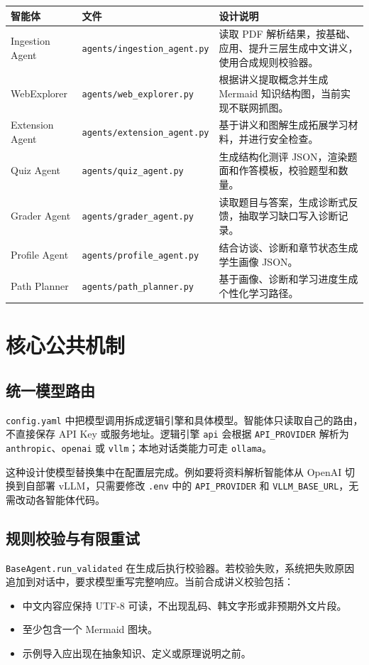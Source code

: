 \documentclass[UTF8,fontset=windows,zihao=-4,openany]{ctexrep}
\begin{document}
\begin{longtable}{p{}p{}p{}}
\toprule
智能体 & 文件 & 设计说明\\
\midrule
Ingestion Agent & \texttt{agents/ingestion\_agent.py} & 读取 PDF 解析结果，按基础、应用、提升三层生成中文讲义，使用合成规则校验器。\\
WebExplorer & \texttt{agents/web\_explorer.py} & 根据讲义提取概念并生成 Mermaid 知识结构图，当前实现不联网抓图。\\
Extension Agent & \texttt{agents/extension\_agent.py} & 基于讲义和图解生成拓展学习材料，并进行安全检查。\\
Quiz Agent & \texttt{agents/quiz\_agent.py} & 生成结构化测评 JSON，渲染题面和作答模板，校验题型和数量。\\
Grader Agent & \texttt{agents/grader\_agent.py} & 读取题目与答案，生成诊断式反馈，抽取学习缺口写入诊断记录。\\
Profile Agent & \texttt{agents/profile\_agent.py} & 结合访谈、诊断和章节状态生成学生画像 JSON。\\
Path Planner & \texttt{agents/path\_planner.py} & 基于画像、诊断和学习进度生成个性化学习路径。\\
\bottomrule
\end{longtable}

\section{核心公共机制}

\subsection{统一模型路由}

\texttt{config.yaml} 中把模型调用拆成逻辑引擎和具体模型。智能体只读取自己的路由，不直接保存 API Key 或服务地址。逻辑引擎 \texttt{api} 会根据 \texttt{API\_PROVIDER} 解析为 \texttt{anthropic}、\texttt{openai} 或 \texttt{vllm}；本地对话类能力可走 \texttt{ollama}。

这种设计使模型替换集中在配置层完成。例如要将资料解析智能体从 OpenAI 切换到自部署 vLLM，只需要修改 \texttt{.env} 中的 \texttt{API\_PROVIDER} 和 \texttt{VLLM\_BASE\_URL}，无需改动各智能体代码。

\subsection{规则校验与有限重试}

\texttt{BaseAgent.run\_validated} 在生成后执行校验器。若校验失败，系统把失败原因追加到对话中，要求模型重写完整响应。当前合成讲义校验包括：
\begin{itemize}
  \item 中文内容应保持 UTF-8 可读，不出现乱码、韩文字形或非预期外文片段。
  \item 至少包含一个 Mermaid 图块。
  \item 示例导入应出现在抽象知识、定义或原理说明之前。
\end{itemize}
\end{document}
